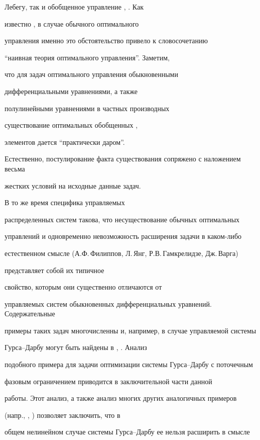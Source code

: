 Лебегу, так и обобщенное управление \cite{gam77}, \cite{warga}. Как


известно \cite{young}, в случае обычного оптимального


управления именно это обстоятельство привело к словосочетанию


``наивная теория оптимального управления''. Заметим,


что для задач оптимального управления обыкновенными


дифференциальными уравнениями, а также 


полулинейными уравнениями в частных производных


существование оптимальных обобщенных \cite{gam77}, \cite{warga}


элементов дается ``практически даром''.


Естественно, постулирование факта существования сопряжено с наложением весьма


жестких условий на исходные данные задач.





В то же время специфика управляемых


распределенных систем такова, что несуществование обычных оптимальных


управлений и одновременно невозможность расширения задачи в каком-либо


естественном смысле (А.Ф.\,Филиппов, Л.\,Янг, Р.В.\,Гамкрелидзе, Дж.\,Варга)


представляет собой их типичное


свойство, которым они существенно отличаются от


управляемых систем обыкновенных дифференциальных уравнений.  Содержательные


примеры таких задач многочисленны и, например, в случае управляемой системы


Гурса--Дарбу могут быть найдены в \cite{SuminD}, \cite{danmatv}. Анализ


подобного примера для задачи оптимизации системы Гурса--Дарбу с поточечным


фазовым ограничением приводится в заключительной части данной


работы. Этот анализ, а также анализ многих других аналогичных примеров


(напр., \cite{SuminD}, \cite{danmatv}) позволяет заключить, что в


общем нелинейном случае системы Гурса--Дарбу ее нельзя расширить в смысле


